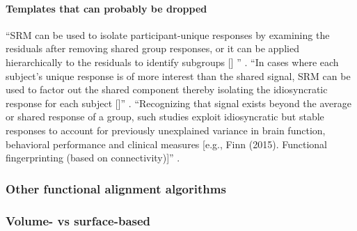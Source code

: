\paragraph{Templates that can probably be dropped}
%
``SRM can be used to isolate participant-unique responses by examining the
residuals after removing shared group responses, or it can be applied
hierarchically to the residuals to identify subgroups [\citet{chen2017shared}]
'' \citep{cohen2017computational}.
%
``In cases where each subject's unique response is of more interest than the
shared signal, SRM can be used to factor out the shared component thereby
isolating the idiosyncratic response for each subject
[\citep{chen2015reduced}]'' \citep{kumar2020brainiak}.
%
``Recognizing that signal exists beyond the average or shared response of a
group, such studies exploit idiosyncratic but stable responses to account for
previously unexplained variance in brain function, behavioral performance and
clinical measures [e.g., Finn (2015). Functional fingerprinting (based on
connectivity)]'' \citep{cohen2017computational}.




\subsubsection{Other functional alignment algorithms}




\subsubsection{Volume- vs surface-based}




